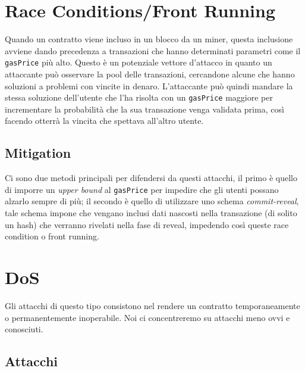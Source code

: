 \section{Race Conditions/Front Running}

Quando un contratto viene incluso in un blocco da un miner,
questa inclusione avviene dando precedenza a transazioni che hanno determinati
parametri come il \verb|gasPrice| più alto.
Questo è un potenziale vettore d'attacco in quanto un attaccante può osservare
la pool delle transazioni, cercandone alcune che hanno soluzioni a problemi con
vincite in denaro. L'attaccante può quindi mandare la stessa soluzione dell'utente
che l'ha risolta con un \verb|gasPrice| maggiore per incrementare la probabilità
che la sua transazione venga validata prima, così facendo otterrà la vincita
che spettava all'altro utente.

\subsection{Mitigation}

Ci sono due metodi principali per difendersi da questi attacchi,
il primo è quello di imporre un \textit{upper bound} al \verb|gasPrice|
per impedire che gli utenti possano alzarlo sempre di più;
il secondo è quello di utilizzare uno schema \textit{commit-reveal},
tale schema impone che vengano inclusi dati nascosti nella transazione
(di solito un hash) che verranno rivelati nella fase di reveal,
impedendo così queste race condition o front running.

\section{DoS}

Gli attacchi di questo tipo consistono nel rendere un contratto temporaneamente
o permanentemente inoperabile.
Noi ci concentreremo su attacchi meno ovvi e conosciuti.

\subsection{Attacchi}

